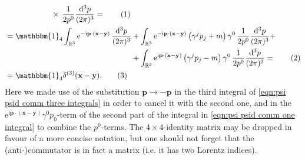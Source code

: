 \documentclass[english, parskip=full]{scrartcl}
\newcommand\numberthis{\addtocounter{equation}{1}\tag{\theequation}}
\newcommand{\intr}{}
\newcommand{\kla}{}
\renewcommand{\i}{\text{i}}
\newcommand{\e}{\text{e}}
\begin{document}
\begin{align*}
&\hspace{2.1cm} \times \, \frac{1}{2p^0} \frac{ \mathrm{d}^{3}p}{(2\pi)^3} = \numberthis \label{eqn:psi psid comm one integral} \\
&= \mathbbm{1}_4\intr\int_{\mathbb{R}^{3}} \e^{-\i \textbf{p}\cdot (\textbf{x} - \textbf{y})} \, \frac{ \mathrm{d}^{3}p}{(2\pi)^3} + \intr\int_{\mathbb{R}^{3}} \e^{-\i \textbf{p}\cdot (\textbf{x} - \textbf{y})} \kla\left( \gamma^j p_j + m \right)\gamma^0 \, \frac{1}{2p^0} \frac{ \mathrm{d}^{3}p}{(2\pi)^3} + \\
& \color{white} = \mathbbm{1}_4\intr\int_{\mathbb{R}^{3}} \e^{-\i \textbf{p}\cdot (\textbf{x} - \textbf{y})} \, \frac{ \mathrm{d}^{3}p}{(2\pi)^3} \color{black} + \int_{\mathbb{R}^{3}} \e^{\i \textbf{p}\cdot (\textbf{x} - \textbf{y})} \kla\left( \gamma^j p_j - m \right)\gamma^0 \, \frac{1}{2p^0} \frac{ \mathrm{d}^{3}p}{(2\pi)^3} = \numberthis \label{eqn:psi psid comm three integrals}\\
&= \mathbbm{1}_4 \delta^{(3)} (\textbf{x} - \textbf{y}). \numberthis 
\end{align*}
Here we made use of the substitution $\textbf{p} \rightarrow -\textbf{p}$ in the third integral of \autoref{eqn:psi psid comm three integrals} in order to cancel it with the second one, and in the $ \e^{\i \textbf{p}\cdot (\textbf{x} - \textbf{y})} \gamma^0p_0$-term of the second part of the integral in \autoref{eqn:psi psid comm one integral} to combine the $p^0$-terms.
The $4\times 4$-identity matrix may be dropped in favour of a more concise notation, but one should not forget that the (anti-)commutator is in fact a matrix (i.e. it has two Lorentz indices).



\end{document}
